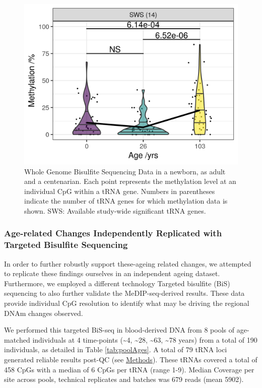 \documentclass[]{book}
\begin{document}
\begin{figure}

{\centering \includegraphics[width=0.6\linewidth]{./figs/heynViolinBBswsOnlyLabelled_BL} 

}

\caption{Whole Genome Bisulfite Sequencing Data in a newborn, as adult and a centenarian. Each point represents the methylation level at an individual CpG within a tRNA gene. Numbers in parentheses indicate the number of tRNA genes for which methylation data is shown. SWS: Available study-wide significant tRNA genes.}\label{fig:heyn}
\end{figure}



\hypertarget{age-related-changes-independently-replicated-with-targeted-bisulfite-sequencing}{%
\subsubsection{Age-related Changes Independently Replicated with Targeted Bisulfite Sequencing}\label{age-related-changes-independently-replicated-with-targeted-bisulfite-sequencing}}

In order to further robustly support these-ageing related changes, we attempted to replicate these findings ourselves in an independent ageing dataset.
Furthermore, we employed a different technology Targeted bisulfite (BiS) sequencing to also further validate the MeDIP-seq-derived results.
These data provide individual CpG resolution to identify what may be driving the regional DNAm changes observed.

We performed this targeted BiS-seq in blood-derived DNA from 8 pools of age-matched individuals at 4 time-points (\textasciitilde4, \textasciitilde28, \textasciitilde63, \textasciitilde78 years) from a total of 190 individuals, as detailed in Table \ref{tab:poolAges}.
A total of 79 tRNA loci generated reliable results post-QC (see \protect\hyperlink{targetedBiSseq}{Methods}).
These tRNAs covered a total of 458 CpGs with a median of 6 CpGs per tRNA (range 1-9).
Median Coverage per site across pools, technical replicates and batches was 679 reads (mean 5902).
\end{document}
